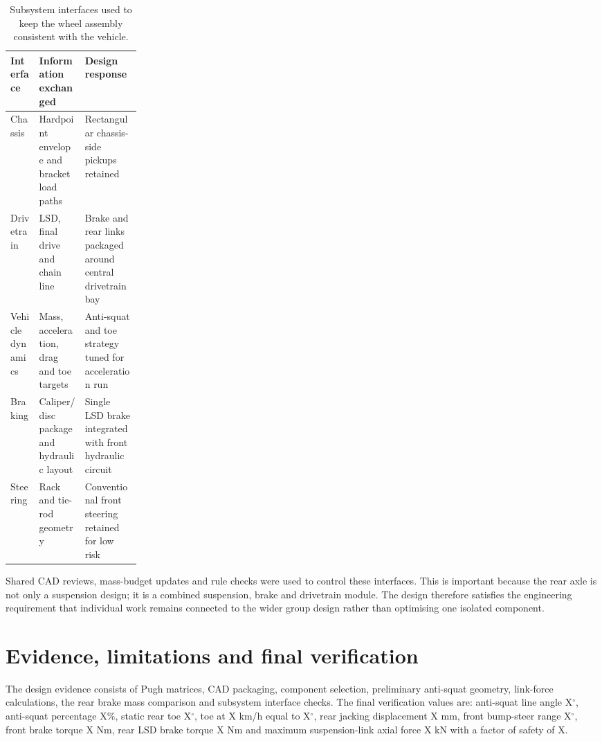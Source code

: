 \begin{table}[H]
\centering
\caption{Subsystem interfaces used to keep the wheel assembly consistent with the vehicle.}
\label{tab:interfaces_wheel}
\setlength{\tabcolsep}{4pt}
\begin{tabularx}{\linewidth}{|>{\raggedright\arraybackslash}p{0.22\linewidth}|>{\raggedright\arraybackslash}X|>{\raggedright\arraybackslash}X|}
\hline
\textbf{Interface} & \textbf{Information exchanged} & \textbf{Design response} \\
\hline
Chassis & Hardpoint envelope and bracket load paths & Rectangular chassis-side pickups retained \\
\hline
Drivetrain & LSD, final drive and chain line & Brake and rear links packaged around central drivetrain bay \\
\hline
Vehicle dynamics & Mass, acceleration, drag and toe targets & Anti-squat and toe strategy tuned for acceleration run \\
\hline
Braking & Caliper/disc package and hydraulic layout & Single LSD brake integrated with front hydraulic circuit \\
\hline
Steering & Rack and tie-rod geometry & Conventional front steering retained for low risk \\
\hline
\end{tabularx}
\end{table}

Shared CAD reviews, mass-budget updates and rule checks were used to control these interfaces. This is important because the rear axle is not only a suspension design; it is a combined suspension, brake and drivetrain module. The design therefore satisfies the engineering requirement that individual work remains connected to the wider group design rather than optimising one isolated component.
\fi

\iffalse
\section{Evidence, limitations and final verification}

The design evidence consists of Pugh matrices, CAD packaging, component selection, preliminary anti-squat geometry, link-force calculations, the rear brake mass comparison and subsystem interface checks. The final verification values are: anti-squat line angle X\(^{\circ}\), anti-squat percentage X\%, static rear toe X\(^{\circ}\), toe at X km/h equal to X\(^{\circ}\), rear jacking displacement X mm, front bump-steer range X\(^{\circ}\), front brake torque X Nm, rear LSD brake torque X Nm and maximum suspension-link axial force X kN with a factor of safety of X.

